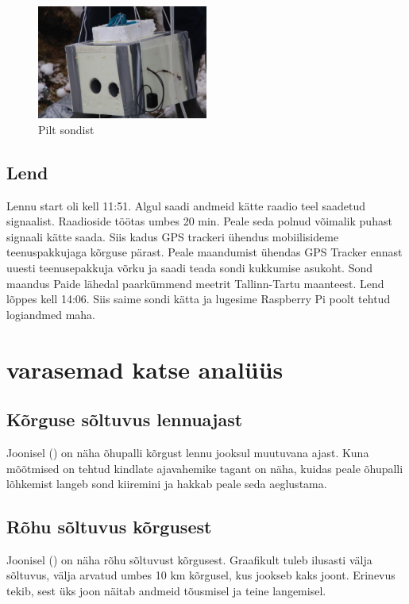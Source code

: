 \documentclass{trkut}%
\begin{document}
\begin{figure}[h]
	\includegraphics[width=0.5\textwidth]{PicGra/sond.jpg}
	\caption{Pilt sondist}
	\label{sond}%
\end{figure}

\subsection{Lend}

Lennu start oli kell 11:51. Algul saadi andmeid kätte raadio teel saadetud signaalist. Raadioside töötas umbes 20 min. Peale seda polnud võimalik puhast signaali kätte saada. Siis kadus GPS trackeri ühendus mobiilisideme teenuspakkujaga kõrguse pärast. Peale maandumist ühendas GPS Tracker ennast uuesti teenusepakkuja võrku ja saadi teada sondi kukkumise asukoht. Sond maandus Paide lähedal paarkümmend meetrit Tallinn-Tartu maanteest. Lend lõppes kell 14:06. Siis saime sondi kätta ja lugesime Raspberry Pi poolt tehtud logiandmed maha.


\section{varasemad katse analüüs}
\subsection{Kõrguse sõltuvus lennuajast}
Joonisel () on näha õhupalli kõrgust lennu jooksul muutuvana ajast. Kuna mõõtmised on tehtud kindlate ajavahemike tagant on näha, kuidas peale õhupalli lõhkemist langeb sond kiiremini ja hakkab peale seda aeglustama. %


\subsection{Rõhu sõltuvus kõrgusest}
Joonisel () on näha rõhu sõltuvust kõrgusest. Graafikult tuleb ilusasti välja sõltuvus, välja arvatud umbes 10 km kõrgusel, kus jookseb kaks joont. Erinevus tekib, sest üks joon näitab andmeid tõusmisel ja teine langemisel.
\end{document}
